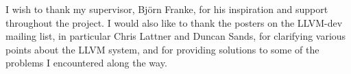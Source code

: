 \begin{acknowledgements}

I wish to thank my supervisor, Bj\"{o}rn Franke, for his inspiration and support throughout the project. I would also like to thank the posters on the LLVM-dev mailing list, in particular Chris Lattner and Duncan Sands, for clarifying various points about the LLVM system, and for providing solutions to some of the problems I encountered along the way.
\end{acknowledgements}
